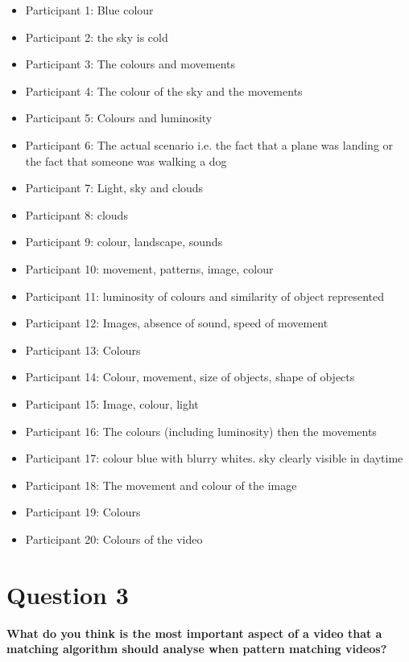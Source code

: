 \begin{itemize}
	\item Participant 1: Blue colour
    \item Participant 2: the sky is cold
    \item Participant 3: The colours and movements
    \item Participant 4: The colour of the sky and the movements
    \item Participant 5: Colours and luminosity
    \item Participant 6: The actual scenario i.e. the fact that a plane was landing or the fact that someone was walking a dog
    \item Participant 7: Light, sky and clouds
    \item Participant 8: clouds
    \item Participant 9: colour, landscape, sounds
    \item Participant 10: movement, patterns, image, colour
    \item Participant 11: luminosity of colours and similarity of object represented
    \item Participant 12: Images, absence of sound, speed of movement
    \item Participant 13: Colours
    \item Participant 14: Colour, movement, size of objects, shape of objects
    \item Participant 15: Image, colour, light
    \item Participant 16: The colours (including luminosity) then the movements
    \item Participant 17: colour blue with blurry whites. sky clearly visible in daytime
    \item Participant 18: The movement and colour of the image
    \item Participant 19: Colours
    \item Participant 20: Colours of the video
\end{itemize}

\section{Question 3}

\textbf{What do you think is the most important aspect of a video that a matching algorithm should analyse when pattern matching videos?}

